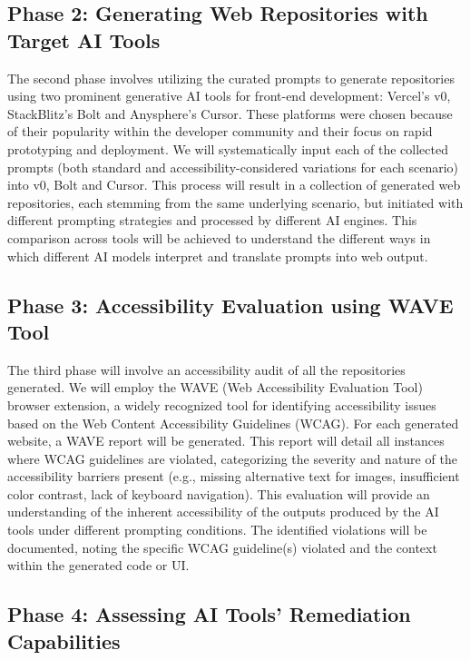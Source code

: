 \documentclass{article}
\begin{document}
\subsection{Phase 2: Generating Web Repositories with Target AI Tools}

The second phase involves utilizing the curated prompts to generate repositories using two prominent generative AI tools for front-end development:
Vercel's v0, StackBlitz's Bolt and Anysphere's Cursor.
These platforms were chosen because of their popularity within the developer community and their focus on rapid prototyping and deployment.
We will systematically input each of the collected prompts (both standard and accessibility-considered variations for each scenario) into  v0, Bolt and Cursor.
This process will result in a collection of generated web repositories, each stemming from the same underlying scenario,
but initiated with different prompting strategies and processed by different AI engines.
This comparison across tools will be achieved to understand the different ways in which different AI models interpret and translate prompts into web output.

\subsection{Phase 3: Accessibility Evaluation using WAVE Tool}

The third phase will involve an accessibility audit of all the repositories generated.
We will employ the WAVE (Web Accessibility Evaluation Tool) browser extension,
a widely recognized tool for identifying accessibility issues based on the Web Content Accessibility Guidelines (WCAG).
For each generated website, a WAVE report will be generated.
This report will detail all instances where WCAG guidelines are violated,
categorizing the severity and nature of the accessibility barriers present
(e.g., missing alternative text for images, insufficient color contrast, lack of keyboard navigation).
This evaluation will provide an understanding of the inherent accessibility of the outputs produced by the AI tools under different prompting conditions.
The identified violations will be documented, noting the specific WCAG guideline(s) violated and the context within the generated code or UI.

\subsection{Phase 4: Assessing AI Tools' Remediation Capabilities}
\end{document}
